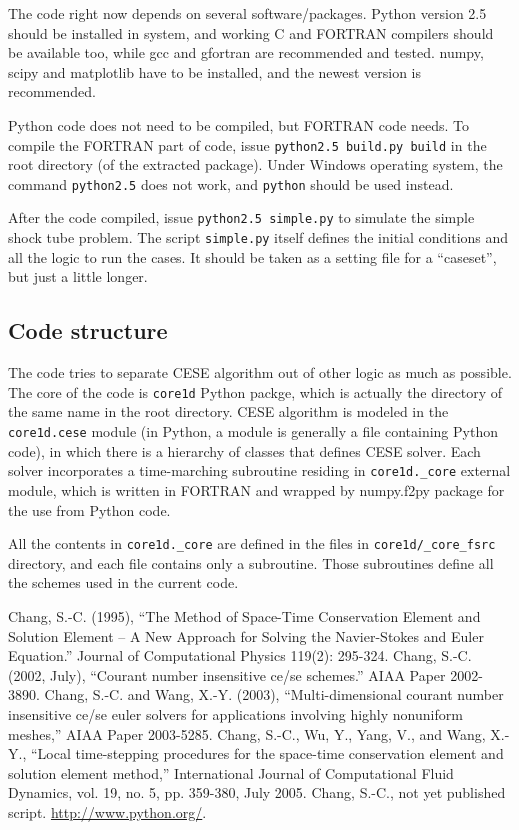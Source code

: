 \documentclass[letterpaper,12pt,dvips]{article}
\numberwithin{equation}{section}
\begin{document}
The code right now depends on several software/packages.
Python version 2.5 should be installed in system, and working C and 
FORTRAN compilers should be available too, while gcc and gfortran are 
recommended and tested.
numpy, scipy and matplotlib have to be installed, and the newest version 
is recommended.

Python code does not need to be compiled, but FORTRAN code needs.
To compile the FORTRAN part of code, issue \verb+python2.5 build.py build+
in the root directory (of the extracted package).
Under Windows operating system, the command \verb+python2.5+ does not 
work, and \verb+python+ should be used instead.

After the code compiled, issue \verb+python2.5 simple.py+ to simulate the 
simple shock tube problem.
The script \verb+simple.py+ itself defines the initial conditions and 
all the logic to run the cases.
It should be taken as a setting file for a ``caseset'', but just a 
little longer.

\subsection{Code structure}

The code tries to separate CESE algorithm out of other logic as much as 
possible.
The core of the code is \verb+core1d+ Python packge, which is actually 
the directory of the same name in the root directory.
CESE algorithm is modeled in the \verb+core1d.cese+ module (in Python, 
a module is generally a file containing Python code), in which there is 
a hierarchy of classes that defines CESE solver.
Each solver incorporates a time-marching subroutine residing in 
\verb+core1d._core+ external module, which is written in FORTRAN and 
wrapped by numpy.f2py package for the use from Python code.

All the contents in \verb+core1d._core+ are defined in the files in 
\verb+core1d/_core_fsrc+ directory, and each file contains only a 
subroutine.
Those subroutines define all the schemes used in the current code.

\begin{thebibliography}{99}
 Chang, S.-C. (1995), 
``The Method of Space-Time Conservation Element and Solution Element -- 
A New Approach for Solving the Navier-Stokes and Euler Equation.''
Journal of Computational Physics 119(2): 295-324.
 Chang, S.-C. (2002, July),
``Courant number insensitive ce/se schemes.'' AIAA Paper 2002-3890.
 Chang, S.-C. and Wang, X.-Y. (2003), 
``Multi-dimensional courant number insensitive ce/se euler solvers for 
applications involving highly nonuniform meshes,'' 
AIAA Paper 2003-5285.
 Chang, S.-C., Wu, Y., Yang, V., and Wang, X.-Y., 
``Local time-stepping procedures for the space-time conservation element 
and solution element method,'' 
International Journal of Computational Fluid Dynamics, 
vol. 19, no. 5, pp. 359-380, July 2005.
 Chang, S.-C., not yet published script.
 \url{http://www.python.org/}.
\end{thebibliography}
\end{document}

